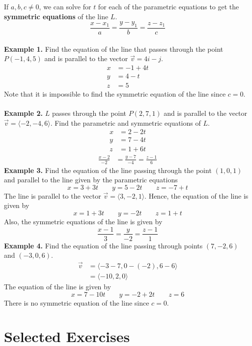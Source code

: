 If $a, b, c \neq 0$, we can solve for $t$ for each of the parametric equations
to get the \textbf{symmetric equations} of the line $L$. \[\frac{x - x_1}{a} = \frac{y - y_1}{b} = \frac{z - z_1}{c}\]
~\\
\noindent\textbf{Example 1. } Find the equation of the line that passes through the point $P(-1, 4, 5)$ and is parallel to the vector $\vec{v} = 4i - j$.
\begin{align*}
    x & = -1 + 4t \\
    y & = 4 - t   \\
    z & = 5
\end{align*}
Note that it is impossible to find the symmetric equation of the line since $c = 0$.
~\\\\
\noindent\textbf{Example 2. } $L$ passes through the point $P(2, 7, 1)$ and is parallel to the vector $\vec{v} = \langle -2, -4, 6 \rangle$. Find the parametric and symmetric equations of $L$.
\begin{align*}
    x & = 2 - 2t \\
    y & = 7 - 4t \\
    z & = 1 + 6t
\end{align*}
\begin{align*}
    \frac{x - 2}{-2} & = \frac{y - 7}{-4} = \frac{z - 1}{6}
\end{align*}
\noindent\textbf{Example 3. } Find the equation of the line passing through the point $(1, 0, 1)$ and parallel to the line given by the parametric equations \[x = 3 + 3t \qquad y = 5 - 2t \qquad z = -7 + t\]
The line is parallel to the vector $\vec{v} = \langle 3, -2, 1 \rangle$. Hence,
the equation of the line is given by \[x = 1 + 3t \qquad y = -2t \qquad z = 1 + t\]
Also, the symmetric equations of the line is given by \[\frac{x - 1}{3} = \frac{y}{-2} = \frac{z - 1}{1}\]
\noindent\textbf{Example 4. } Find the equation of the line passing through points $(7, -2, 6)$ and $(-3, 0, 6)$.
\begin{align*}
    \vec{v} & = \langle -3 - 7, 0 - (-2), 6 - 6 \rangle \\
            & = \langle -10, 2, 0 \rangle
\end{align*}
The equation of the line is given by \[x = 7 - 10t \qquad y = -2 + 2t \qquad z = 6\]
There is no symmetric equation of the line since $c = 0$.

\newpage

\section*{Selected Exercises}

